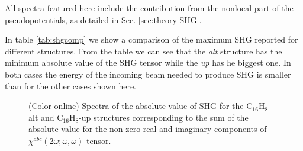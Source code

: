 \documentclass[pss]{wiley2sp} %
\begin{document}
All spectra featured here include the contribution from the nonlocal part of the pseudopotentials, as detailed in Sec. \ref{sec:theory-SHG}.

In table \ref{tab:shgcomp} we show a comparison of the maximum SHG reported for different structures. From the table we can see that the \emph{alt} structure has the minimum absolute value of the SHG tensor while the \emph{up} has he biggest one. In both cases the energy of the incoming beam needed to produce SHG is smaller than for the other cases shown here.

\begin{figure}
\hfill
{}
\caption{(Color online) Spectra of the absolute value of SHG for the C$_{16}$H$_{8}$-alt 
    and C$_{16}$H$_{8}$-up structures corresponding to the sum of the absolute 
    value for the non zero real and imaginary components of $\chi^{abc}(2\omega;\omega,
    \omega) $ tensor.\label{fig:shg-abs-both}}
\end{figure}
\end{document}
